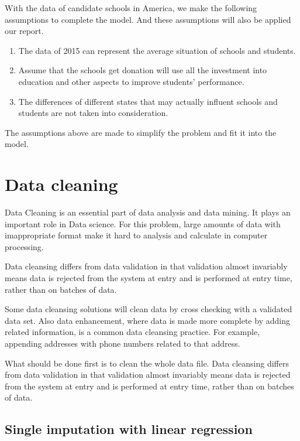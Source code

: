 	With the data of candidate schools in America, we make the following assumptions to complete the model. And these assumptions will also be applied our report.

	\begin{enumerate}
		\item The data of 2015 can represent the average situation of schools and students.
		\item Assume that the schools get donation will use all the investment into education and other aspects to improve students' performance.
		\item The differences of different states that may actually influent schools and students are not taken into consideration.
	\end{enumerate}

	The assumptions above are made to simplify the problem and fit it into the model.

\section{Data cleaning}
	Data Cleaning is an essential part of data analysis and data mining. It plays an important role in Data science. For this problem, large amounts of data with imappropriate format make it hard to analysis and calculate in computer processing.

	Data cleansing differs from data validation in that validation almost invariably means data is rejected from the system at entry and is performed at entry time, rather than on batches of data\cite{url9}.

	Some data cleansing solutions will clean data by cross checking with a validated data set. Also data enhancement, where data is made more complete by adding related information, is a common data cleansing practice. For example, appending addresses with phone numbers related to that address\cite{url10}.

	What should be done first is to clean the whole data file. Data cleansing differs from data validation in that validation almost invariably means data is rejected from the system at entry and is performed at entry time, rather than on batches of data.


	\subsection{Single imputation with linear regression}

